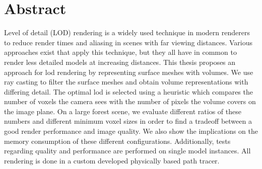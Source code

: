 \chapter*{Abstract}
Level of detail (LOD) rendering is a widely used technique in modern renderers to reduce render times and aliasing in scenes with far viewing distances.
Various approaches exist that apply this technique, but they all have in common to render less detailed models at increasing distances.
This thesis proposes an approach for \acs{lod} rendering by representing surface meshes with volumes.
We use ray casting to filter the surface meshes and obtain volume representations with differing detail.
The optimal \ac{lod} is selected using a heuristic which compares the number of voxels the camera sees with the number of pixels the volume covers on the image plane.
On a large forest scene, we evaluate different ratios of these numbers and different minimum voxel sizes in order to find a tradeoff between a good render performance and image quality.
We also show the implications on the memory consumption of these different configurations.
Additionally, tests regarding quality and performance are performed on single model instances.
All rendering is done in a custom developed physically based path tracer.